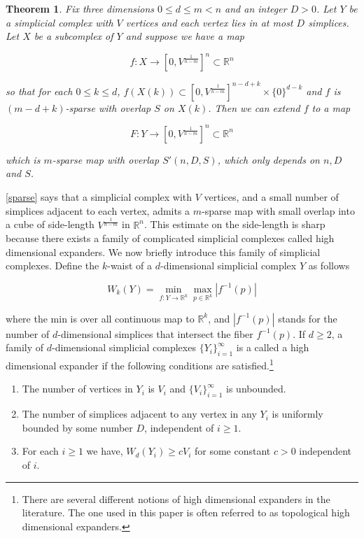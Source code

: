 \documentclass[12pt]{article}
\newtheorem{theorem}{Theorem}
\newcommand{\RR}{\mathbb{R}}
\begin{document}
	\begin{theorem} \label{sparse_extension}  Fix three dimensions $0 \le d \le m < n$ and an integer $D > 0$. Let $Y$ be a simplicial complex with $V$ vertices and each vertex lies in at most $D$ simplices. Let $X$ be a subcomplex of $Y$ and suppose we have a map
		
		$$f: X \to [0,V^{\frac{1}{n-m}}]^n  \subset \RR^{n}$$
		
		\noindent so that for each $0 \le k \le d$, $f(X(k)) \subset [0,V^{\frac{1}{n-m}}]^{n-d+k} \times \{0\}^{d-k}$ and $f$ is $(m-d+k)$-sparse with overlap $S$ on $X(k)$. Then we can extend $f$ to a map
		
		$$F: Y \to [0, V^{\frac{1}{n-m}}]^{n} \subset \RR^{n}$$
		
		\noindent which is $m$-sparse map with overlap $S'(n,D,S)$, which only depends on $n, D$ and $S$.
	\end{theorem}
	
	\cref{sparse} says that a simplicial complex with $V$ vertices, and a small number of simplices adjacent to each vertex, admits a $m$-sparse map with small overlap into a cube of side-length $V^{\frac{1}{n-m}}$ in $\RR^n$. This estimate on the side-length is sharp because there exists a family of complicated simplicial complexes called high dimensional expanders. We now briefly introduce this family of simplicial complexes. Define the $k$-waist of a $d$-dimensional simplicial complex $Y$ as follows
	
	$$W_k(Y) =  \min_{f:Y \to \RR^k} \max_{p \in \RR^k} |f^{-1}(p)|$$
	
	\noindent where the min is over all continuous map to $\RR^k$, and $|f^{-1}(p)|$ stands for the number of $d$-dimensional simplices that intersect the fiber $f^{-1}(p)$.  If $d \ge 2$, a family of $d$-dimensional simplicial complexes $\{Y_i\}_{i=1}^{\infty}$ is a called a high dimensional expander if the following conditions are satisfied.\footnote{There are several different notions of high dimensional expanders in the literature. The one used in this paper is often referred to as topological high dimensional expanders.}
	
	\begin{enumerate}
		\item The number of vertices in $Y_i$ is $V_i$ and $\{V_i\}_{i=1}^{\infty}$ is unbounded.
		\item The number of simplices adjacent to any vertex in any $Y_i$ is uniformly bounded by some number $D$, independent of $i \ge 1$.
		\item For each $i \ge 1$ we have, $W_d(Y_i) \ge cV_i$ for some constant $c > 0$ independent of $i$. 
	\end{enumerate}
	
\end{document}
